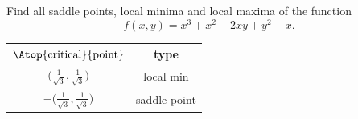 \begin{question}[M200 2008D] %
Find all saddle points, local minima and local maxima of the function
\begin{equation*}
   f(x,y) = x^3 + x^2 - 2xy + y^2 - x.
\end{equation*}
\end{question}

%

\begin{answer}
\renewcommand{\arraystretch}{1.3}
     \begin{tabular}{|c|c|}
     \hline
    $\Atop{\text{critical}}{\text{point}}$  & type \\    
    \hline
     $\big(\frac{1}{\sqrt{3}},\frac{1}{\sqrt{3}}\big)$   & local min  \\ \hline
     $-\big(\frac{1}{\sqrt{3}},\frac{1}{\sqrt{3}}\big)$  & saddle point \\  \hline
     \end{tabular}
\renewcommand{\arraystretch}{1.0}
\end{answer}


